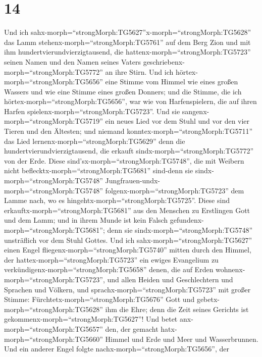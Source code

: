 \hypertarget{section-13}{%
\section{14}\label{section-13}}

 Und ich
sahx-morph=``strongMorph:TG5627''x-morph=``strongMorph:TG5628'' das Lamm
stehenx-morph=``strongMorph:TG5761'' auf dem Berg Zion und mit ihm
hundertvierundvierzigtausend, die hattenx-morph=``strongMorph:TG5723''
seinen Namen und den Namen seines Vaters
geschriebenx-morph=``strongMorph:TG5772'' an ihre Stirn. 
Und ich hörtex-morph=``strongMorph:TG5656'' eine Stimme vom Himmel wie
eines großen Wassers und wie eine Stimme eines großen Donners; und die
Stimme, die ich hörtex-morph=``strongMorph:TG5656'', war wie von
Harfenspielern, die auf ihren Harfen
spielenx-morph=``strongMorph:TG5723''.  Und sie
sangenx-morph=``strongMorph:TG5719'' ein neues Lied vor dem Stuhl und
vor den vier Tieren und den Ältesten; und niemand
konntex-morph=``strongMorph:TG5711'' das Lied
lernenx-morph=``strongMorph:TG5629'' denn die
hundertvierundvierzigtausend, die erkauft
sindx-morph=``strongMorph:TG5772'' von der Erde.  Diese
sind'sx-morph=``strongMorph:TG5748'', die mit Weibern nicht
beflecktx-morph=``strongMorph:TG5681'' sind-denn sie
sindx-morph=``strongMorph:TG5748''
Jungfrauen-undx-morph=``strongMorph:TG5748''
folgenx-morph=``strongMorph:TG5723'' dem Lamme nach, wo es
hingehtx-morph=``strongMorph:TG5725''. Diese sind
erkauftx-morph=``strongMorph:TG5681'' aus den Menschen zu Erstlingen
Gott und dem Lamm;  und in ihrem Munde ist kein Falsch
gefundenx-morph=``strongMorph:TG5681''; denn sie
sindx-morph=``strongMorph:TG5748'' unsträflich vor dem Stuhl Gottes.
 Und ich sahx-morph=``strongMorph:TG5627'' einen Engel
fliegenx-morph=``strongMorph:TG5740'' mitten durch den Himmel, der
hattex-morph=``strongMorph:TG5723'' ein ewiges Evangelium zu
verkündigenx-morph=``strongMorph:TG5658'' denen, die auf Erden
wohnenx-morph=``strongMorph:TG5723'', und allen Heiden und Geschlechtern
und Sprachen und Völkern,  und
sprachx-morph=``strongMorph:TG5723'' mit großer Stimme:
Fürchtetx-morph=``strongMorph:TG5676'' Gott und
gebetx-morph=``strongMorph:TG5628'' ihm die Ehre; denn die Zeit seines
Gerichts ist gekommenx-morph=``strongMorph:TG5627''! Und betet
anx-morph=``strongMorph:TG5657'' den, der gemacht
hatx-morph=``strongMorph:TG5660'' Himmel und Erde und Meer und
Wasserbrunnen.  Und ein anderer Engel folgte
nachx-morph=``strongMorph:TG5656'', der
